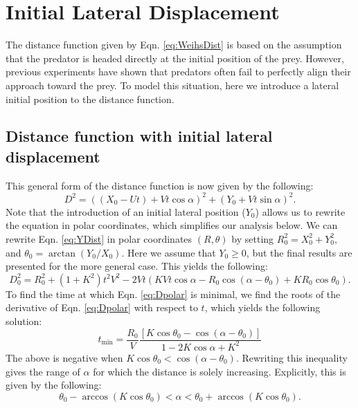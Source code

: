 \documentclass[12pt]{article}
\def\ds{\displaystyle}
\begin{document}
\section{Initial Lateral Displacement}
The distance function given by Eqn. \ref{eq:WeihsDist} is based on the assumption that the predator is headed directly at the initial position of the prey. 
However, previous experiments have shown that predators often fail to perfectly align their approach toward the prey.
To model this situation, here we introduce a lateral initial position to the distance function. 

\subsection{Distance function with initial lateral displacement}
This general form of the distance function is now given by the following:    
%
\begin{equation}
D^2 = ((X_0 - Ut) + Vt\cos\alpha)^2 + (Y_0 + Vt\sin\alpha)^2.
\label{eq:YDist}
\end{equation}
%
Note that the introduction of an initial lateral position ($Y_0$) allows us to rewrite the equation in polar coordinates, which simplifies our analysis below.
We can rewrite Eqn. \ref{eq:YDist} in polar coordinates $(R,\theta)$ by setting $R_0^2 = X_0^2 + Y_0^2,$ and $\theta_0 = \arctan(Y_0/X_0)$. 
Here we assume that $Y_0 \geq 0$, but the final results are presented for the more general case. 
This yields the following:
%
\begin{equation}
D_0^2 = R_0^2 + (1 + K^2) t^2 V^2 - 
 2 V t(K V t \cos \alpha  - R_0 \cos(\alpha - \theta_0) + K R_0 \cos \theta_0).
 \label{eq:Dpolar}
\end{equation}
%
To find the time at which Eqn. \ref{eq:Dpolar} is minimal, we find the roots of the derivative of Eqn. \ref{eq:Dpolar} with respect to $t$, which yields the following solution:
%
\begin{equation}
t_{\text{min}} = \ds \frac{R_0}{V} \frac{\left[K \cos \theta_0 - \cos(\alpha - \theta_0)\right ]}{1- 2K \cos \alpha + K^2}
\label{eq:tmin}
\end{equation}
%
The above is negative when $K \cos \theta_0 < \cos(\alpha - \theta_0).$ 
Rewriting this inequality gives the range of $\alpha$ for which the distance is solely increasing. Explicitly, this is given by the following:
%
\begin{equation}
\theta_0 - \arccos(K \cos \theta_0) < \alpha < \theta_0 + \arccos(K \cos \theta_0).
\label{eq:alphabound}
\end{equation}
\end{document}
